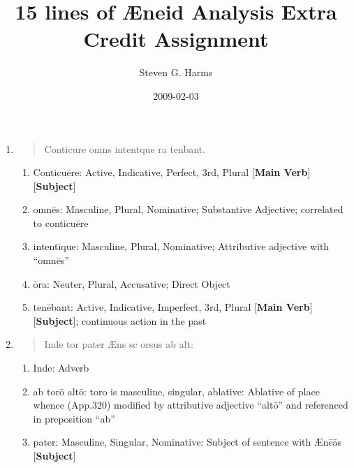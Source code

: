 \documentclass[]{article}
\title{15 lines of {\AE}neid Analysis Extra Credit Assignment}
\author{Steven G. Harms }
\date{2009-02-03}
\newcommand{\latify}[1]{
        \Large
        \begin{verse}
          \begin{metrica}
          {#1}\\
          \end{metrica}
        \end{verse}
        \normalsize
}
\begin{document}

\ifpdf
{}
\else
{}
\fi

\maketitle

\begin{enumerate}
	
\item \latify{Conticu{}re omn{\macron {e}}s intent{\macron {\i}}que {\macron {o}}ra ten{\macron {e}}bant.}

\begin{enumerate}

	\item Conticu\=ere:  Active, Indicative, Perfect, 3rd, Plural [\textbf{Main Verb}]  [\textbf{Subject}]

	\item omn\=es:  Masculine, Plural, Nominative; Substantive Adjective; correlated to conticu\={e}re

	\item intent\={\i}que:  Masculine, Plural, Nominative; Attributive adjective with ``omn\={e}s''

	\item \=ora:  Neuter, Plural, Accusative; Direct Object

	\item ten\=ebant:  Active, Indicative, Imperfect, 3rd, Plural [\textbf{Main Verb}] [\textbf{Subject}]; continuous action in the past 

\end{enumerate}


\item \latify{Inde tor{} pater {\AE}n{}{\macron {a}}s s{\macron {\i}}c orsus ab alt{\macron {o}}:}
\begin{enumerate}                                          
	
	\item Inde:  Adverb
	
	\item ab tor\=o alt\=o: toro is masculine, singular, ablative:  Ablative of place whence (App.320) modified by attributive adjective ``alt\={o}'' and referenced in preposition ``ab''
	
	\item pater: Masculine, Singular, Nominative:  Subject of sentence with {\AE}n\={e}\={a}s [\textbf{Subject}]
	

\end{enumerate}
\end{enumerate}
\end{document}
